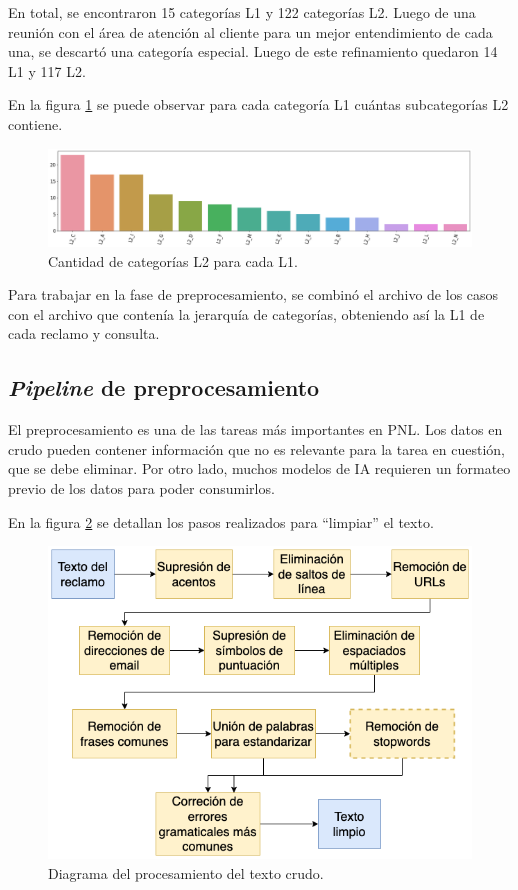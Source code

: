 En total, se encontraron 15 categorías L1 y 122 categorías L2. Luego de una reunión con el área de atención al cliente para un mejor entendimiento de cada una, se descartó una categoría especial. Luego de este refinamiento quedaron 14 L1 y 117 L2.

En la figura \ref{fig:catl2porl1} se puede observar para cada categoría L1 cuántas subcategorías L2 contiene.

\begin{figure}[htbp]
	\centering
	\includegraphics[width=1\textwidth]{./Figures/catl2porl1.png}
	\caption{Cantidad de categorías L2 para cada L1.}
	\label{fig:catl2porl1}
\end{figure}

Para trabajar en la fase de preprocesamiento, se combinó el archivo de los casos con el archivo que contenía la jerarquía de categorías, obteniendo así la L1 de cada reclamo y consulta.

\subsection{\textit{Pipeline} de preprocesamiento}

El preprocesamiento es una de las tareas más importantes en PNL. Los datos en crudo pueden contener información que no es relevante para la tarea en cuestión, que se debe eliminar. Por otro lado, muchos modelos de IA requieren un formateo previo de los datos para poder consumirlos.

En la figura \ref{fig:pipeline-texto} se detallan los pasos realizados para ``limpiar'' el texto.

\begin{figure}[htbp]
	\centering
	\includegraphics[width=.7\textwidth]{./Figures/pipeline-texto.png}
	\caption{Diagrama del procesamiento del texto crudo.}
	\label{fig:pipeline-texto}
\end{figure}

